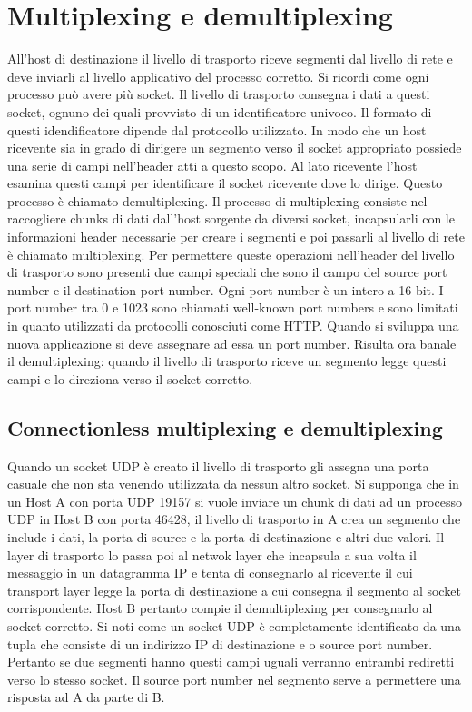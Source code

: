 \section{Multiplexing e demultiplexing}
All'host di destinazione il livello di trasporto riceve segmenti dal livello di rete e deve inviarli al livello applicativo del processo corretto. Si 
ricordi come ogni processo pu\`o avere pi\`u socket. Il livello di trasporto consegna i dati a questi socket, ognuno dei quali provvisto di un 
identificatore univoco. Il formato di questi idendificatore dipende dal protocollo utilizzato. In modo che un host ricevente sia in grado di dirigere un 
segmento verso il socket appropriato possiede una serie di campi nell'header atti a questo scopo. Al lato ricevente l'host esamina questi campi per 
identificare il socket ricevente dove lo dirige. Questo processo \`e chiamato demultiplexing. Il processo di multiplexing consiste nel raccogliere chunks di 
dati dall'host sorgente da diversi socket, incapsularli con le informazioni header necessarie per creare i segmenti e poi passarli al livello di rete \`e 
chiamato multiplexing. Per permettere queste operazioni nell'header del livello di trasporto sono presenti due campi speciali che sono il campo del source 
port number e il destination port number. Ogni port number \`e un intero a 16 bit. I port number tra 0 e 1023 sono chiamati well-known port numbers e sono 
limitati in quanto utilizzati da protocolli conosciuti come HTTP. Quando si sviluppa una nuova applicazione si deve assegnare ad essa un port number. 
Risulta ora banale il demultiplexing: quando il livello di trasporto riceve un segmento legge questi campi e lo direziona verso il socket corretto. 
\subsection{Connectionless multiplexing e demultiplexing}
Quando un socket UDP \`e creato il livello di trasporto gli assegna una porta casuale che non sta venendo utilizzata da nessun altro socket. Si supponga che
in un Host A con porta UDP 19157 si vuole inviare un chunk di dati ad un processo UDP in Host B con porta 46428, il livello di trasporto in A crea un 
segmento che include i dati, la porta di source e la porta di destinazione e altri due valori. Il layer di trasporto lo passa poi al netwok layer che 
incapsula a sua volta il messaggio in un datagramma IP e tenta di consegnarlo al ricevente il cui transport layer legge la porta di destinazione a cui 
consegna il segmento al socket corrispondente. Host B pertanto compie il demultiplexing per consegnarlo al socket corretto. Si noti come un socket UDP \`e
completamente identificato da una tupla che consiste di un indirizzo IP di destinazione e o source port number. Pertanto se due segmenti hanno questi campi
uguali verranno entrambi rediretti verso lo stesso socket. Il source port number nel segmento serve a permettere una risposta ad A da parte di B. 
